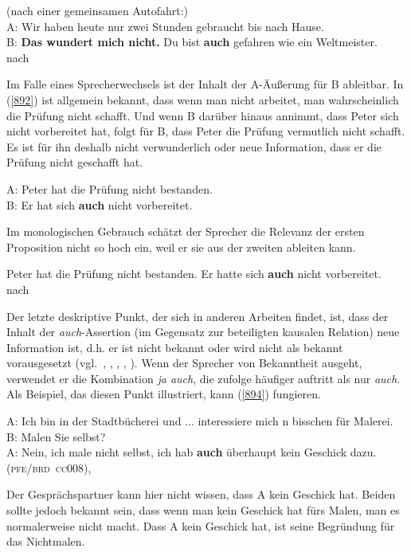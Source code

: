 {\begin{exe}
	\ex\label{891}
	(nach einer gemeinsamen Autofahrt:)\\	 
	A: Wir haben heute nur zwei Stunden gebraucht bis nach Hause.\\
	B: \textbf{Das wundert mich nicht.} Du bist \textbf{auch} gefahren wie ein Weltmeister.
	\newline
	\hbox{}\hfill\hbox{nach \citet[101]{Burkhardt1982}}
\end{exe}	
Im Falle eines Sprecherwechsels ist der Inhalt der A-Äußerung für B ableitbar. In (\ref{892}) ist allgemein bekannt, dass wenn man nicht arbeitet, man wahrscheinlich die Prüfung nicht schafft. Und wenn B darüber hinaus annimmt, dass Peter sich nicht vorbereitet hat, folgt für B, dass Peter die Prüfung vermutlich nicht schafft. Es ist für ihn deshalb nicht verwunderlich oder neue Information, dass er die Prüfung nicht geschafft hat.

\begin{exe}
	\ex\label{892}
	A: Peter hat die Prüfung nicht bestanden.\\	 
	B: Er hat sich \textbf{auch} nicht vorbereitet.
\end{exe}
Im monologischen Gebrauch schätzt der Sprecher die Relevanz der ersten Proposition nicht so hoch ein, weil er sie aus der zweiten ableiten kann.

\begin{exe}
	\ex\label{893}
	Peter hat die Prüfung nicht bestanden. Er hatte sich \textbf{auch} nicht vorbereitet.
	\newline
	\hbox{}\hfill\hbox{nach \citet[227]{Karagjosova2004}}
\end{exe}
Der letzte deskriptive Punkt, der sich in anderen Arbeiten findet, ist, dass der Inhalt der \textit{auch}-Assertion (im Gegensatz zur beteiligten kausalen Relation) neue Information ist, d.h. er ist nicht bekannt oder wird nicht als bekannt vorausgesetzt (vgl.\ \citealt[215]{Franck1980}, \citealt[156]{Thurmair1989}, \citealt[71]{Koenig1997}, \citealt[343]{Karagjosova2004}, \citealt[73]{Kwon2005}). Wenn der Sprecher von Bekanntheit ausgeht, verwendet er die Kombination \textit{ja auch}, die \citet[156]{Thurmair1989} zufolge häufiger auftritt als nur \textit{auch}. Als Beispiel, das diesen Punkt illustriert, kann (\ref{894}) fungieren.

\begin{exe}
	\ex\label{894}
	A: Ich bin in der Stadtbücherei und ... interessiere mich  n bisschen für Malerei.\\
	B: Malen Sie selbst?\\
	A: Nein, ich male nicht selbst, ich hab \textbf{auch} überhaupt kein Geschick dazu.
	\newline
	\hbox{}\hfill\hbox{\textsc{(pfe/brd cc008)}, \citet[69]{Kwon2005}}
\end{exe}
Der Gesprächspartner kann hier nicht wissen, dass A kein Geschick hat. Beiden sollte jedoch bekannt sein, dass wenn man kein Geschick hat fürs Malen, man es normalerweise nicht macht. Dass A kein Geschick hat, ist seine Begründung für das Nichtmalen.

}
